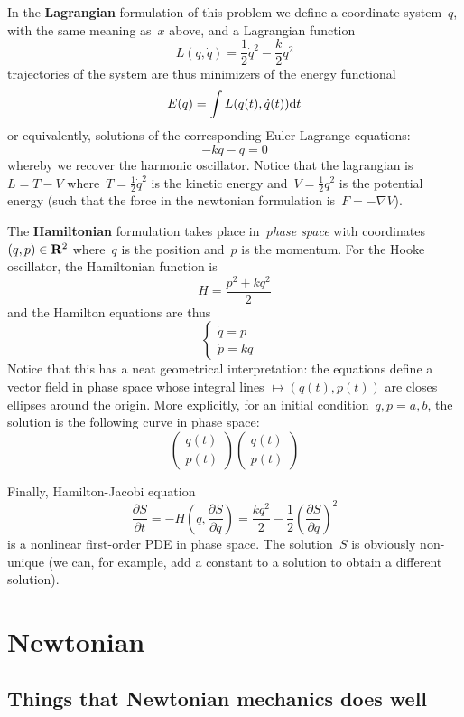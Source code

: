 In the {\bf Lagrangian} formulation of this problem we define a coordinate
system~$q$, with the same meaning as~$x$ above, and a Lagrangian function
\[
	L(q,\dot q) = \frac12\dot q^2-\frac k2q^2
\]
trajectories of the system are thus minimizers of the energy functional
\[
	E(q) = \int L(q(t), \dot q(t))\mathrm{d} t
\]
or equivalently, solutions of the corresponding Euler-Lagrange equations:
\[
	-kq -\ddot q = 0
\]
whereby we recover the harmonic oscillator.
Notice that the lagrangian is~$L=T-V$ where~$T=\frac12\dot q^2$ is the
kinetic energy and~$V=\frac12 q^2$ is the potential energy (such that the
force in the newtonian formulation is~$F=-\nabla V$).

The {\bf Hamiltonian} formulation takes place in~\emph{phase space}
with coordinates~$(q,p)\in\mathbf{R}^2$ where~$q$ is the position and~$p$ is the
momentum.  For the Hooke oscillator, the Hamiltonian function is
\[
	H = \frac{p^2 + kq^2}2
\]
and the Hamilton equations are thus
\[
	\begin{cases}
	\dot q = p & \\
	\dot p = kq
	\end{cases}
\]
Notice that this has a neat geometrical interpretation: the equations define
a vector field in phase space whose integral lines $\mapsto(q(t),p(t))$ are
closes ellipses around the origin.  More explicitly, for an initial
condition~$q,p=a,b$, the solution is the following curve in phase space:
\[
	\begin{pmatrix}
		q(t) \\
		p(t)
	\end{pmatrix}
	\begin{pmatrix}
		q(t) \\
		p(t)
	\end{pmatrix}
\]

Finally, Hamilton-Jacobi equation
\[
	\frac{\partial S}{\partial t}
	=
	-H\left(q, \frac{\partial S}{\partial q}\right)
	=
	\frac{kq^2}2
	-\frac 12\left(\frac{\partial S}{\partial q}\right)^2
\]
is a nonlinear first-order PDE in phase space.  The solution~$S$ is obviously
non-unique (we can, for example, add a constant to a solution to obtain a
different solution).



\section{Newtonian}

\subsection{Things that Newtonian mechanics does well}


